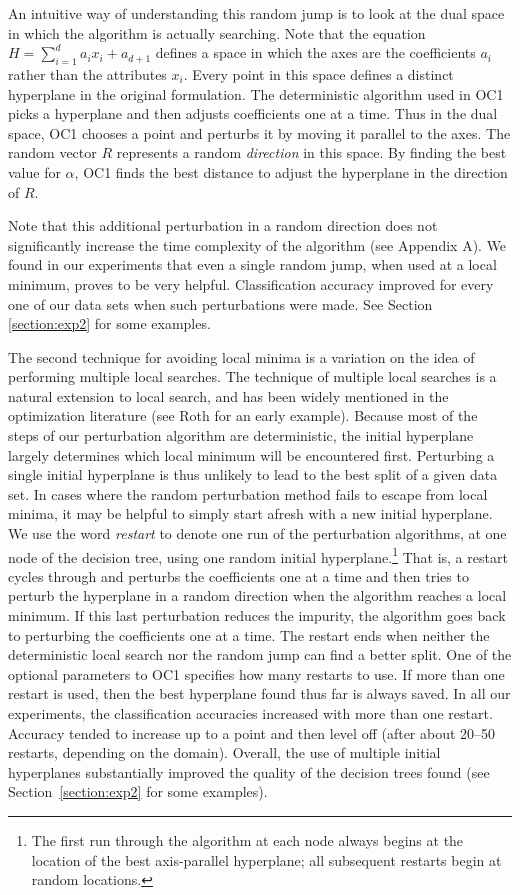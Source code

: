 An intuitive way of understanding this random jump is to look at the
dual space in which the algorithm is actually searching.  Note that
the equation \(H = \sum_{i=1}^{d} a_i x_i + a_{d+1} \) defines a space
in which the axes are the coefficients $a_i$ rather than the
attributes $x_i$.  Every point in this space defines a distinct
hyperplane in the original formulation.  The deterministic algorithm
used in OC1 picks a hyperplane and then adjusts coefficients one at a
time.  Thus in the dual space, OC1 chooses a point and perturbs it by
moving it parallel to the axes.  The random vector $R$ represents a
random {\it direction} in this space.  By finding the best value for
$\alpha$, OC1 finds the best distance to adjust the hyperplane in the
direction of $R$.

Note that this additional perturbation in a random direction does not
significantly increase the time complexity of the algorithm (see
Appendix A).  We found in our experiments that even a single random
jump, when used at a local minimum, proves to be very helpful.
Classification accuracy improved for every one of our data sets when
such perturbations were made.  See Section \ref{section:exp2} for some
examples.

The second technique for avoiding local minima is a variation on the
idea of performing multiple local searches. The technique of multiple
local searches is a natural extension to local search, and has been
widely mentioned in the optimization literature (see Roth
\citeyear{roth/70} for an early example).  Because most of the steps
of our perturbation algorithm are deterministic, the initial
hyperplane largely determines which local minimum will be encountered
first.  Perturbing a single initial hyperplane is thus unlikely to
lead to the best split of a given data set.  In cases where the random
perturbation method fails to escape from local minima, it may be
helpful to simply start afresh with a new initial hyperplane.  We use
the word {\it restart} to denote one run of the perturbation
algorithms, at one node of the decision tree, using one random initial
hyperplane.\footnote{The first run through the algorithm at each node
always begins at the location of the best axis-parallel hyperplane;
all subsequent restarts begin at random locations.}  That is, a
restart cycles through and perturbs the coefficients one at a time and
then tries to perturb the hyperplane in a random direction when the
algorithm reaches a local minimum.  If this last perturbation reduces
the impurity, the algorithm goes back to perturbing the coefficients
one at a time.  The restart ends when neither the deterministic local
search nor the random jump can find a better split.  One of the
optional parameters to OC1 specifies how many restarts to use.  If
more than one restart is used, then the best hyperplane found thus far
is always saved.  In all our experiments, the classification
accuracies increased with more than one restart.  Accuracy tended to
increase up to a point and then level off (after about 20--50
restarts, depending on the domain).  Overall, the use of multiple
initial hyperplanes substantially improved the quality of the decision
trees found (see Section~\ref{section:exp2} for some examples).
 
